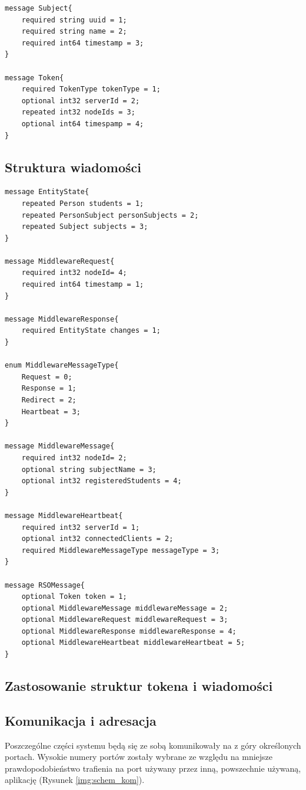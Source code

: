 {\begin{lstlisting}
message Subject{
    required string uuid = 1;
	required string name = 2;
	required int64 timestamp = 3;
}

message Token{
    required TokenType tokenType = 1;
    optional int32 serverId = 2;
    repeated int32 nodeIds = 3;
    optional int64 timespamp = 4;
}
\end{lstlisting}

\subsection[Struktura wiadomości]{Struktura wiadomości}
\begin{lstlisting}
message EntityState{
    repeated Person students = 1;
    repeated PersonSubject personSubjects = 2;
    repeated Subject subjects = 3;
}

message MiddlewareRequest{
	required int32 nodeId= 4;
    required int64 timestamp = 1;
}

message MiddlewareResponse{
    required EntityState changes = 1;
}

enum MiddlewareMessageType{
    Request = 0;
    Response = 1;
    Redirect = 2;
    Heartbeat = 3;
}

message MiddlewareMessage{
	required int32 nodeId= 2;
    optional string subjectName = 3;
    optional int32 registeredStudents = 4;    
}

message MiddlewareHeartbeat{
    required int32 serverId = 1;
    optional int32 connectedClients = 2;
    required MiddlewareMessageType messageType = 3;
}

message RSOMessage{
    optional Token token = 1;
    optional MiddlewareMessage middlewareMessage = 2;
    optional MiddlewareRequest middlewareRequest = 3;
    optional MiddlewareResponse middlewareResponse = 4;
    optional MiddlewareHeartbeat middlewareHeartbeat = 5;
}
\end{lstlisting}

\subsection[Zastosowanie struktur tokena i wiadomości]{Zastosowanie struktur tokena i wiadomości}

\subsection[Komunikacja i adresacja]{Komunikacja i adresacja}

\par{Poszczególne części systemu będą się ze sobą komunikowały na z góry określonych portach. Wysokie numery portów zostały wybrane ze względu na mniejsze prawdopodobieństwo trafienia na port używany przez inną, powszechnie używaną, aplikację (Rysunek \ref{img:schem_kom}).}

}
